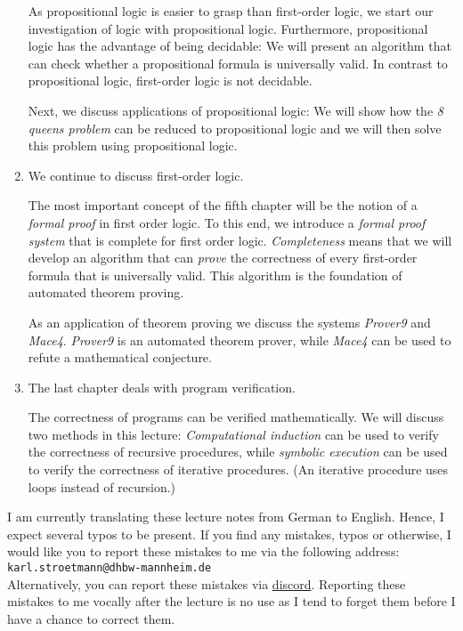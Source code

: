 \begin{enumerate}
      As propositional logic is easier to grasp than first-order logic, we start our investigation
      of logic with propositional logic.  Furthermore, propositional logic has the advantage of
      being decidable:  We will present an algorithm that can check whether a propositional formula
      is universally valid.  In contrast to propositional logic, first-order logic is not decidable.

      Next, we discuss applications of propositional logic:  We will show how the \emph{8 queens problem} 
      can be reduced to propositional logic and we will then solve this problem using propositional logic.
\item We continue to discuss first-order logic.

      The most important concept of the fifth chapter will be the notion of a \emph{formal proof} in
      first order logic.  To this end, we introduce a \emph{formal proof system} that is
      \colorbox{amethyst}{complete} for first order logic.  \emph{Completeness} means that we will develop an
      algorithm that can \emph{prove} the correctness of every first-order formula that is
      universally valid.  This algorithm is the foundation of automated theorem proving.

      As an application of theorem proving we discuss the systems \textsl{Prover9} and
      \textsl{Mace4}.  \textsl{Prover9} is an automated theorem prover, while \textsl{Mace4} can be
      used to refute a mathematical conjecture.

\item The last chapter deals with program verification.

      The correctness of programs can be verified mathematically.  We will discuss two methods in
      this lecture: \emph{Computational induction} can be used to verify the correctness of
      recursive procedures, while \emph{symbolic execution} can be used to verify the correctness of
      iterative procedures. (An iterative procedure uses loops instead of recursion.)
\end{enumerate}


\remarkEng
I am currently translating these lecture notes from German to English.  Hence, I expect several typos to be present.  
If you find any mistakes, typos or otherwise, I would like you to report these mistakes to me via
the following address:
\\[0.2cm]
\hspace*{1.3cm}
\texttt{karl.stroetmann@dhbw-mannheim.de}
\\[0.2cm]
Alternatively, you can report these mistakes via \href{https://discordapp.com}{discord}.
Reporting these mistakes to me vocally after the lecture is no use as I tend to forget them before I
have a chance to correct them.


